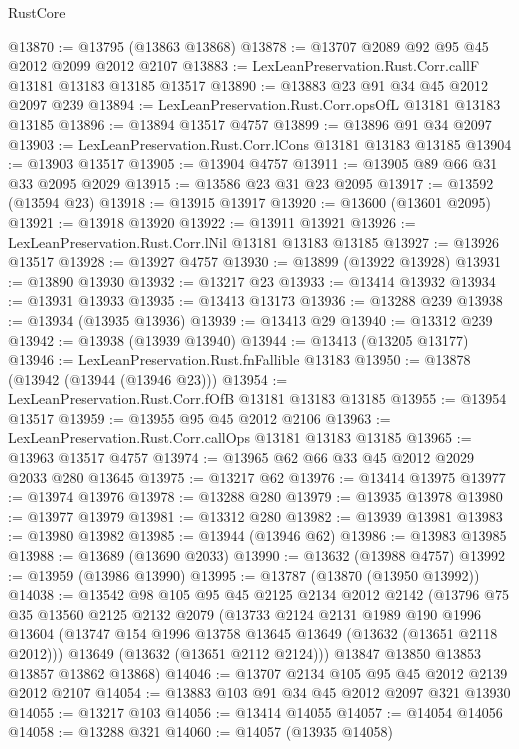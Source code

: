 \begin{lexlean}{RustCore}
\begin{coremodule}
@13870 := @13795 (@13863 @13868)
@13878 := @13707 @2089 @92 @95 @45 @2012 @2099 @2012 @2107
@13883 := LexLeanPreservation.Rust.Corr.callF @13181 @13183 @13185 @13517
@13890 := @13883 @23 @91 @34 @45 @2012 @2097 @239
@13894 := LexLeanPreservation.Rust.Corr.opsOfL @13181 @13183 @13185
@13896 := @13894 @13517 @4757
@13899 := @13896 @91 @34 @2097
@13903 := LexLeanPreservation.Rust.Corr.lCons @13181 @13183 @13185
@13904 := @13903 @13517
@13905 := @13904 @4757
@13911 := @13905 @89 @66 @31 @33 @2095 @2029
@13915 := @13586 @23 @31 @23 @2095
@13917 := @13592 (@13594 @23)
@13918 := @13915 @13917
@13920 := @13600 (@13601 @2095)
@13921 := @13918 @13920
@13922 := @13911 @13921
@13926 := LexLeanPreservation.Rust.Corr.lNil @13181 @13183 @13185
@13927 := @13926 @13517
@13928 := @13927 @4757
@13930 := @13899 (@13922 @13928)
@13931 := @13890 @13930
@13932 := @13217 @23
@13933 := @13414 @13932
@13934 := @13931 @13933
@13935 := @13413 @13173
@13936 := @13288 @239
@13938 := @13934 (@13935 @13936)
@13939 := @13413 @29
@13940 := @13312 @239
@13942 := @13938 (@13939 @13940)
@13944 := @13413 (@13205 @13177)
@13946 := LexLeanPreservation.Rust.fnFallible @13183
@13950 := @13878 (@13942 (@13944 (@13946 @23)))
@13954 := LexLeanPreservation.Rust.Corr.fOfB @13181 @13183 @13185
@13955 := @13954 @13517
@13959 := @13955 @95 @45 @2012 @2106
@13963 := LexLeanPreservation.Rust.Corr.callOps @13181 @13183 @13185
@13965 := @13963 @13517 @4757
@13974 := @13965 @62 @66 @33 @45 @2012 @2029 @2033 @280 @13645
@13975 := @13217 @62
@13976 := @13414 @13975
@13977 := @13974 @13976
@13978 := @13288 @280
@13979 := @13935 @13978
@13980 := @13977 @13979
@13981 := @13312 @280
@13982 := @13939 @13981
@13983 := @13980 @13982
@13985 := @13944 (@13946 @62)
@13986 := @13983 @13985
@13988 := @13689 (@13690 @2033)
@13990 := @13632 (@13988 @4757)
@13992 := @13959 (@13986 @13990)
@13995 := @13787 (@13870 (@13950 @13992))
@14038 := @13542
    @98
    @105
    @95
    @45
    @2125
    @2134
    @2012
    @2142
    (@13796
      @75
      @35
      @13560
      @2125
      @2132
      @2079
      (@13733
        @2124
        @2131
        @1989
        @190
        @1996
        @13604
        (@13747 @154 @1996 @13758 @13645 @13649 (@13632 (@13651 @2118 @2012)))
        @13649
        (@13632 (@13651 @2112 @2124)))
      @13847
      @13850
      @13853
      @13857
      @13862
      @13868)
@14046 := @13707 @2134 @105 @95 @45 @2012 @2139 @2012 @2107
@14054 := @13883 @103 @91 @34 @45 @2012 @2097 @321 @13930
@14055 := @13217 @103
@14056 := @13414 @14055
@14057 := @14054 @14056
@14058 := @13288 @321
@14060 := @14057 (@13935 @14058)

\end{coremodule}
\end{lexlean}
